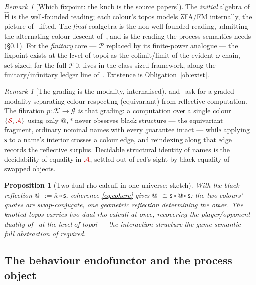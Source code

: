 \documentclass[11pt]{article}
\makeatletter
\newcommand{\Ps}{\mathcal{P}}
\newcommand{\sH}{\widehat{\mathsf{H}}}
\newcommand{\swap}{\mathsf{s}}
\newcommand{\sorts}{\mathcal{G}}
\newcommand{\Ks}{\mathcal{K}}
\newcommand{\quo}[1]{@#1}
\newcommand{\drf}[1]{{*}#1}
\newcommand{\rc}[1]{\textcolor{redcopy}{#1}}   %
\newcommand{\St}{\rc{\mathcal S}}
\newcommand{\At}{\rc{\mathcal A}}
\theoremstyle{plain}
\newtheorem{proposition}[theorem]{Proposition}
\theoremstyle{definition}
\theoremstyle{remark}
\newtheorem{remark}[theorem]{Remark}
\makeatother
\begin{document}
\begin{remark}[Which fixpoint: the knob is the source papers']\label{rem:knob}
The \emph{initial} algebra of $\sH$ is the well-founded reading; each colour's topos models ZFA/FM
internally, the picture of~\cite[\S5]{rset} lifted. The \emph{final} coalgebra is the
non-well-founded reading, admitting the alternating-colour descent of~\cite[\S7]{rset}, and is the
reading the process semantics needs (\S\ref{sec:proc}). For the \emph{finitary} core --- $\Ps$
replaced by its finite-power analogue --- the fixpoint exists at the level of topoi as the
colimit/limit of the evident $\omega$-chain, set-sized; for the full $\Ps$ it lives in the class-sized
framework, along the finitary/infinitary ledger line of~\cite[\S5.5--5.6, \S8.1]{rset}. Existence is
Obligation~\ref{ob:exist}.
\end{remark}

\begin{remark}[The grading is the modality, internalised]\label{rem:grading}
\cite[\S6.5]{rset} and~\cite[Rem.~8]{knotrho} ask for a graded modality separating colour-respecting
(equivariant) from reflective computation. The fibration $p\colon\Ks\to\sorts$ \emph{is} that grading:
a computation over a single colour $\{\St,\At\}$ using only $\quo{},\drf{}$ never observes black
structure --- the equivariant fragment, ordinary nominal names with every guarantee intact --- while
applying $\swap$ to a name's interior crosses a colour edge, and reindexing along that edge records the
reflective surplus. Decidable structural identity of names is the decidability of equality in $\At$,
settled out of red's sight by black equality of swapped objects.
\end{remark}

\begin{proposition}[Two dual rho calculi in one universe; sketch]\label{prop:dual}
With the black reflection $\quo{}_{\!\overline{\phantom{a}}}:=\overline\kappa\circ\swap$, coherence
\eqref{eq:cohere} gives $\quo{}_{\!\overline{\phantom{a}}}\cong\swap\circ\quo{}\circ\swap$: the two
colours' quotes are swap-conjugate, one geometric reflection determining the other. The knotted topos
carries two dual rho calculi at once, recovering the player/opponent duality of~\cite[Cor.~2]{rset} at
the level of topoi --- the interaction structure the game-semantic full abstraction of
\cite{ajm,ho} required.
\end{proposition}

\subsection{The behaviour endofunctor and the process object}\label{sec:proc}
\end{document}
